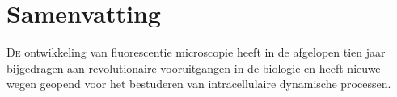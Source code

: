 %
%
\noquote
{}
\normalsize
\chpos{22mm}{12mm}
\chapter*{Samenvatting}

\lettrine{D}{e} ontwikkeling van fluorescentie microscopie
heeft in de afgelopen tien jaar bijgedragen aan revolutionaire vooruitgangen in de biologie
en heeft nieuwe wegen geopend voor het bestuderen van
intracellulaire dynamische processen. 



